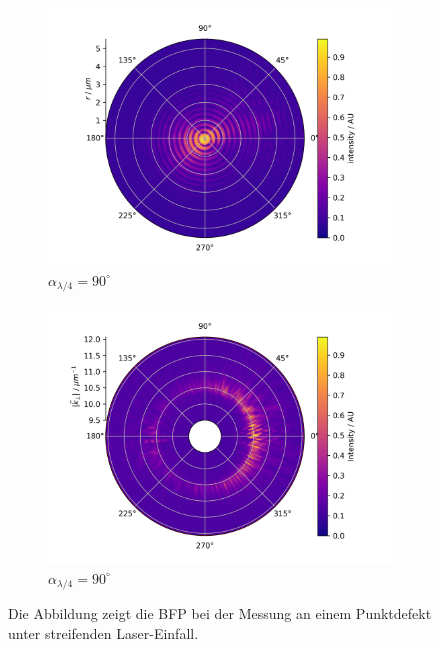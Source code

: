 \documentclass[titlepage,  ngerman]{article}
\begin{document}
\begin{figure}[h!]
\begin{subfigure}[b]{0.49\textwidth}
		\centering
		\includegraphics[width=\textwidth]{figures/fp/fp_90.png}
		\caption{$\alpha_{\lambda/4} = 90^\circ$}
	\end{subfigure}
	\begin{subfigure}[b]{0.5\textwidth}
		\centering
		\includegraphics[width=\textwidth]{figures/spin_hall/polar/polar_90.png}
		\caption{$\alpha_{\lambda/4} = 90^\circ$}
	\end{subfigure}

	\caption[BFP in Abhängigkeit der Abstrahlrichtung]{Die Abbildung zeigt die BFP bei der Messung an einem Punktdefekt unter streifenden Laser-Einfall.}			
\end{figure}
	\newpage
\end{document}
